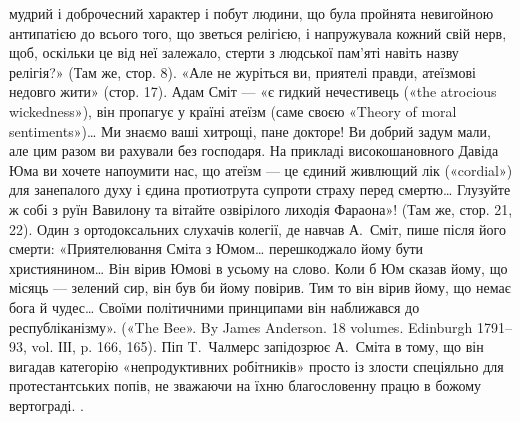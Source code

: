 {мудрий і доброчесний характер і побут людини, що була пройнята невигойною
антипатією до всього того, що зветься релігією, і напружувала
кожний свій нерв, щоб, оскільки це від неї залежало, стерти з людської
пам’яті навіть назву релігія?» (Там же, стор. 8). «Але не журіться ви,
приятелі правди, атеїзмові недовго жити» (стор. 17). Адам Сміт — «є
гидкий нечестивець («the atrocious wickedness»), він пропагує у країні
атеїзм (саме своєю «Theory of moral sentiments»)\dots{} Ми знаємо ваші хитрощі,
пане докторе! Ви добрий задум мали, але цим разом ви рахували без господаря.
На прикладі високошановного Давіда Юма ви хочете напоумити
нас, що атеїзм — це єдиний живлющий лік («cordial») для занепалого
духу і єдина протиотрута супроти страху перед смертю\dots{} Глузуйте ж
собі з руїн Вавилону та вітайте озвірілого лиходія Фараона»! (Там же,
стор. 21, 22). Один з ортодоксальних слухачів колегії, де навчав А.~Сміт,
пише після його смерти: «Приятелювання Сміта з Юмом\dots{} перешкоджало
йому бути християнином\dots{} Він вірив Юмові в усьому на слово.
Коли б Юм сказав йому, що місяць — зелений сир, він був би йому повірив.
Тим то він вірив йому, що немає бога й чудес\dots{} Своїми політичними
принципами він наближався до республіканізму». («The Bee». By James
Anderson. 18 volumes. Edinburgh 1791--93, vol. ІІІ, p. 166, 165). Піп
T.~Чалмерс запідозрює А.~Сміта в тому, що він вигадав категорію «непродуктивних
робітників» просто із злости спеціяльно для протестантських
попів, не зважаючи на їхню благословенну працю в божому вертограді.
}.

